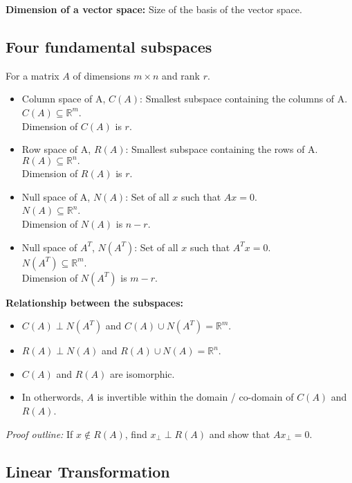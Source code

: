 \textbf{Dimension of a vector space:} Size of the basis of the vector space.

\subsection{Four fundamental subspaces}
For a matrix $A$ of dimensions $m \times n$ and rank $r$.
\begin{itemize}
	\item Column space of A, $C(A)$: Smallest subspace containing the columns of A.\\
	$C(A) \subseteq \mathbb{R}^m$.\\
	Dimension of $C(A)$ is $r$.
	\item Row space of A, $R(A)$: Smallest subspace containing the rows of A.\\
	$R(A) \subseteq \mathbb{R}^n.$\\ 
	Dimension of $R(A)$ is $r$.
	\item Null space of A, $N(A)$: Set of all $x$ such that $Ax = 0$.\\
	$N(A) \subseteq \mathbb{R}^n$.\\
	Dimension of $N(A)$ is $n-r$.
	\item Null space of $A^T$, $N(A^T)$: Set of all $x$ such that $A^Tx = 0$.\\
	$N(A^T) \subseteq \mathbb{R}^m$.\\
	Dimension of $N(A^T)$ is $m-r$.
\end{itemize}

\begin{mdframed}[backgroundcolor=SlateGray2!40,linecolor=Firebrick4]
\textbf{Relationship between the subspaces:}
\begin{itemize}
	\item $C(A) \perp N(A^T)$ and $C(A) \cup N(A^T) = \mathbb{R}^m$.
	\item $R(A) \perp N(A)$ and $R(A) \cup N(A) = \mathbb{R}^n$.
    \item $C(A)$ and $R(A)$ are isomorphic.
    \item In otherwords, $A$ is invertible within the domain / co-domain of 
            $C(A)$ and $R(A)$.
\end{itemize}
\textit{Proof outline:} If $x \notin R(A)$, find $x_{\perp} \perp R(A)$ and
show that $Ax_{\perp} = 0$.


\end{mdframed}

\subsection{Linear Transformation}

